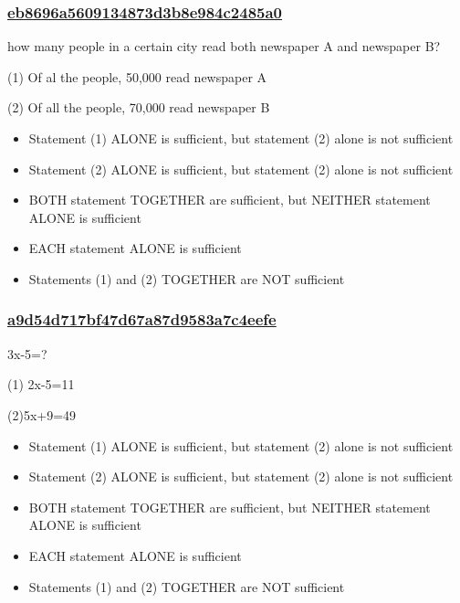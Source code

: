 \documentclass[]{beamer}
\begin{document}
\begin{frame}
    \frametitle{\underline{eb8696a5609134873d3b8e984c2485a0}}
    how many people in a certain city read both newspaper A and newspaper B?\par
(1) Of al the people, 50,000 read newspaper A\par
(2) Of all the people, 70,000 read newspaper B    
    \begin{itemize}
        \item
            Statement (1) ALONE is sufficient, but statement (2) alone is not sufficient
        \item
            Statement (2) ALONE is sufficient, but statement (2) alone is not sufficient
        \item
            BOTH statement TOGETHER are sufficient, but NEITHER statement ALONE is sufficient
        \item
            EACH statement ALONE is sufficient
        \item
            Statements (1) and (2) TOGETHER are NOT sufficient
    \end{itemize}
\end{frame}

\begin{frame}
    \frametitle{\underline{a9d54d717bf47d67a87d9583a7c4eefe}}
    3x-5=?\par
(1) 2x-5=11\par
(2)5x+9=49    
    \begin{itemize}
        \item
            Statement (1) ALONE is sufficient, but statement (2) alone is not sufficient
        \item
            Statement (2) ALONE is sufficient, but statement (2) alone is not sufficient
        \item
            BOTH statement TOGETHER are sufficient, but NEITHER statement ALONE is sufficient
        \item
            EACH statement ALONE is sufficient
        \item
            Statements (1) and (2) TOGETHER are NOT sufficient
    \end{itemize}
\end{frame}
\end{document}
